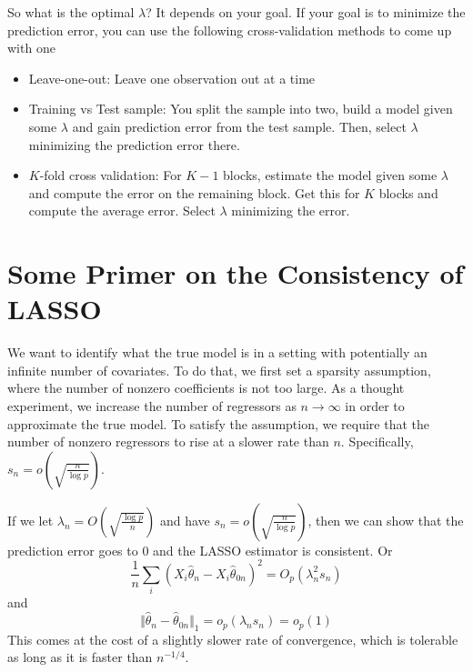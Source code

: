 So what is the optimal $\lambda$? It depends on your goal. If your goal is to minimize the prediction error, you can use the following cross-validation methods to come up with one
\begin{itemize}
\item Leave-one-out: Leave one observation out at a time
\item Training vs Test sample: You split the sample into two, build a model given some $\lambda$ and gain prediction error from the test sample. Then, select $\lambda$ minimizing the prediction error there.
\item $K$-fold cross validation:  For $K-1$ blocks, estimate the model given some $\lambda$ and compute the error on the remaining block. Get this for $K$ blocks and compute the average error. Select $\lambda$ minimizing the error. 
\end{itemize}
\section{Some Primer on the Consistency of LASSO}
We want to identify what the true model is in a setting with potentially an infinite number of covariates. To do that, we first set a sparsity assumption, where the number of nonzero coefficients is not too large. As a thought experiment, we increase the number of regressors as $n\to\infty$ in order to approximate the true model. To satisfy the assumption, we require that the number of nonzero regressors to rise at a slower rate than $n$. Specifically, $s_n = o\left(\sqrt{\frac{n}{\log p}}\right)$. \par
If we let $\lambda_n = O\left(\sqrt{\frac{\log p}{n}}\right)$ and have $s_n=o\left(\sqrt{\frac{n}{\log p}}\right)$, then we can show that the prediction error goes to 0 and the LASSO estimator is consistent. Or
\[
\frac{1}{n}\sum_i(X_i\hat{\theta}_n-X_i\hat{\theta}_{0n})^2=O_p(\lambda_n^2s_n)
\]
and 
\[
\Vert \hat{\theta}_n-\hat{\theta}_{0n}\Vert_1 = o_p(\lambda_n s_n) = o_p(1)
\]
This comes at the cost of a slightly slower rate of convergence, which is tolerable as long as it is faster than $n^{-1/4}$.


